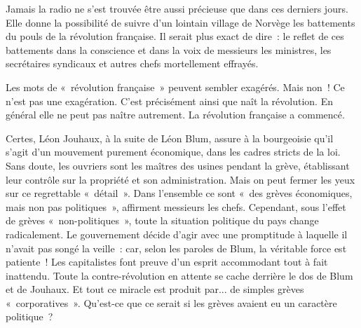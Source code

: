 \documentclass[french,twoside]{book} %
\begin{document}
\noindent Jamais la radio ne s’est trouvée être aussi précieuse que dans ces derniers jours. Elle donne la possibilité de suivre d’un lointain village de Norvège les battements du pouls de la révolution française. Il serait plus exact de dire : le reflet de ces battements dans la conscience et dans la voix de messieurs les ministres, les secrétaires syndicaux et autres chefs mortellement effrayés.\par
Les mots de « révolution française » peuvent sembler exagérés. Mais non ! Ce n’est pas une exagération. C’est précisément ainsi que naît la révolution. En général elle ne peut pas naître autrement. La révolution française a commencé.\par
Certes, Léon Jouhaux, à la suite de Léon Blum, assure à la bourgeoisie qu’il s’agit d’un mouvement purement économique, dans les cadres stricts de la loi. Sans doute, les ouvriers sont les maîtres des usines pendant la grève, établissant leur contrôle sur la propriété et son administration. Mais on peut fermer les yeux sur ce regrettable « détail ». Dans l’ensemble ce sont « des grèves économiques, mais non pas politiques », affirment messieurs les chefs. Cependant, sous l’effet de grèves « non-politiques », toute la situation politique du pays change radicalement. Le gouvernement décide d’agir avec une promptitude à laquelle il n’avait pas songé la veille : car,  selon les paroles de Blum, la véritable force est patiente ! Les capitalistes font preuve d’un esprit accommodant tout à fait inattendu. Toute la contre-révolution en attente se cache derrière le dos de Blum et de Jouhaux. Et tout ce miracle est produit par... de simples grèves « corporatives ». Qu’est-ce que ce serait si les grèves avaient eu un caractère politique ?\par
\end{document}
